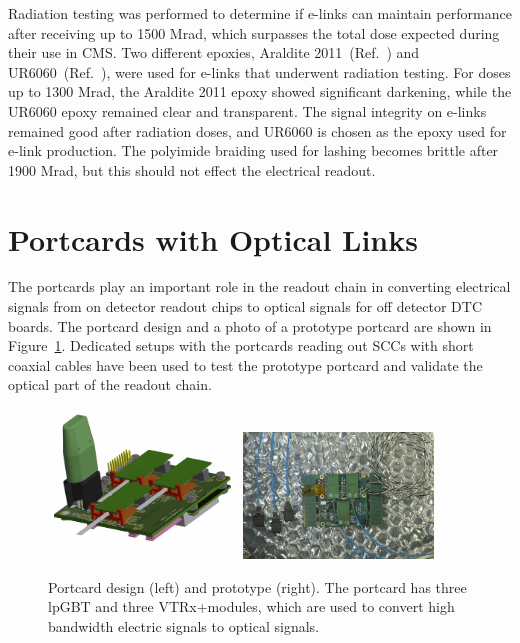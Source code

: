 \documentclass[a4paper,11pt]{article}
\newcommand{\vtrxp}{VTRx+}
\newcommand{\mrad}{Mrad}
\newcommand{\fig}{Figure}
\begin{document}
Radiation testing was performed to determine if e-links can maintain performance after receiving up to 1500 \mrad, which surpasses the total dose expected during their use in CMS.
Two different epoxies, Araldite 2011~(Ref.~\cite{ref:araldite}) and UR6060~(Ref.~\cite{ref:ur}), were used for e-links that underwent radiation testing.
For doses up to 1300 \mrad, the Araldite 2011 epoxy showed significant darkening, while the UR6060 epoxy remained clear and transparent.
The signal integrity on e-links remained good after radiation doses, and UR6060 is chosen as the epoxy used for e-link production.
The polyimide braiding used for lashing becomes brittle after 1900 \mrad, but this should not effect the electrical readout.

\section{Portcards with Optical Links}
\label{sec:optical}

The portcards play an important role in the readout chain in converting electrical signals from on detector readout chips to optical signals for off detector DTC boards.
The portcard design and a photo of a prototype portcard are shown in \fig~\ref{fig:port_card}.
Dedicated setups with the portcards reading out SCCs with short coaxial cables have been used to test the prototype portcard and validate the optical part of the readout chain.

\begin{figure}[htbp]
\centering
\includegraphics[width=0.45\textwidth,origin=c]{../figures/port_card_design.png}
\qquad
\includegraphics[width=0.45\textwidth,origin=c]{../figures/port_card_back.jpeg}
\caption{
\label{fig:port_card}
Portcard design (left) and prototype (right).
The portcard has three lpGBT and three \vtrxp modules, which are used to convert high bandwidth electric signals to optical signals.
}
\end{figure}
\end{document}
